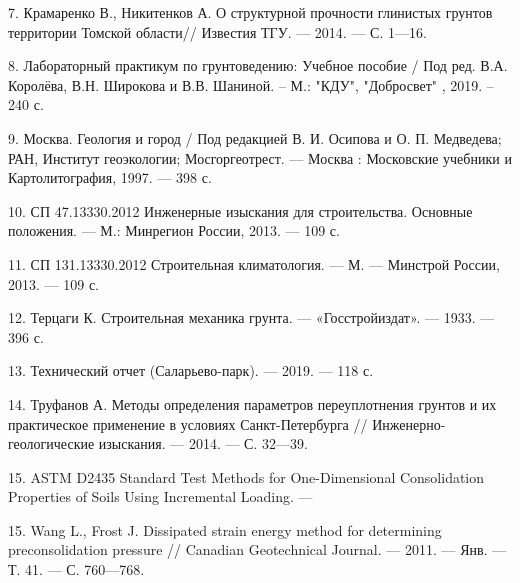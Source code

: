 7. Крамаренко В., Никитенков А. О структурной прочности глинистых грунтов
территории Томской области// Известия ТГУ. --- 2014. ---
С. 1---16.

8. Лабораторный практикум по грунтоведению: Учебное пособие / Под ред. В.А. Королёва, 
В.Н. Широкова и В.В. Шаниной. – М.: "КДУ", "Добросвет" , 2019. – 240 с.

9. Москва. Геология и город / Под редакцией В. И. Осипова и О. П. Медведева; 
РАН, Институт геоэкологии; Мосгоргеотрест. --- Москва : Московские учебники 
и Картолитография, 1997. --- 398 с.

10. СП 47.13330.2012 Инженерные изыскания для строительства. 
Основные положения. --- М.: Минрегион России, 2013. --- 109 с.

11. СП 131.13330.2012 Строительная климатология. --- М. --- Минстрой России, 2013. --- 109 с.

12. Терцаги К. Строительная механика грунта. --- «Госстройиздат». ---
1933. --- 396 с.

13. Технический отчет (Саларьево-парк). --- 2019. --- 118 с.

14. Труфанов А. Методы определения параметров переуплотнения грунтов и
их практическое применение в условиях Санкт-Петербурга // Инженерно-
геологические изыскания. --- 2014. --- С. 32---39.

15. ASTM D2435 Standard Test Methods for One-Dimensional 
Consolidation Properties of Soils Using Incremental Loading. --- 

15. Wang L., Frost J. Dissipated strain energy method for determining
preconsolidation pressure // Canadian Geotechnical Journal. — 2011. —
Янв. — Т. 41. — С. 760—768.